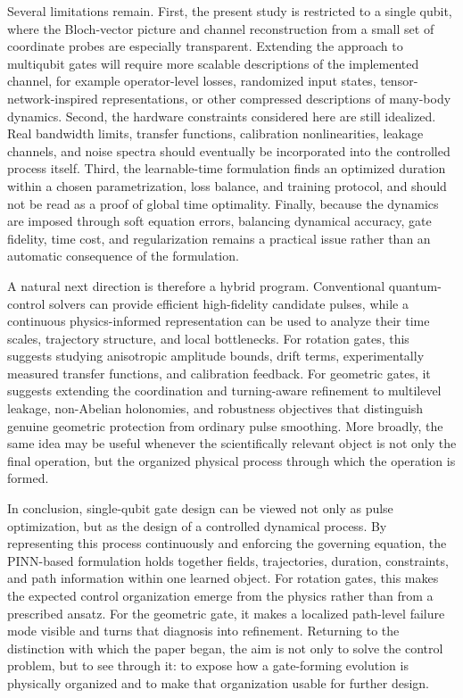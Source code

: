 \documentclass[aps,prx,reprint,superscriptaddress,nofootinbib,longbibliography,floatfix,showkeys]{revtex4-2}
\begin{document}
Several limitations remain.  First, the present study is restricted to a
single qubit, where the Bloch-vector picture and channel reconstruction
from a small set of coordinate probes are especially transparent.  Extending
the approach to multiqubit gates will require more scalable descriptions of
the implemented channel, for example operator-level losses, randomized
input states, tensor-network-inspired representations, or other compressed
descriptions of many-body dynamics.  Second, the hardware constraints
considered here are still idealized.  Real bandwidth limits, transfer
functions, calibration nonlinearities, leakage channels, and noise spectra
should eventually be incorporated into the controlled process itself.
Third, the learnable-time formulation finds an optimized duration within a
chosen parametrization, loss balance, and training protocol, and should not
be read as a proof of global time optimality.  Finally, because the
dynamics are imposed through soft equation errors, balancing dynamical
accuracy, gate fidelity, time cost, and regularization remains a practical
issue rather than an automatic consequence of the formulation.

A natural next direction is therefore a hybrid program.  Conventional
quantum-control solvers can provide efficient high-fidelity candidate
pulses, while a continuous physics-informed representation can be used to
analyze their time scales, trajectory structure, and local bottlenecks.
For rotation gates, this suggests studying anisotropic amplitude bounds,
drift terms, experimentally measured transfer functions, and calibration
feedback.  For geometric gates, it suggests extending the coordination and
turning-aware refinement to multilevel leakage, non-Abelian holonomies, and
robustness objectives that distinguish genuine geometric protection from
ordinary pulse smoothing.  More broadly, the same idea may be useful
whenever the scientifically relevant object is not only the final operation,
but the organized physical process through which the operation is formed.

In conclusion, single-qubit gate design can be viewed not only as pulse
optimization, but as the design of a controlled dynamical process.  By
representing this process continuously and enforcing the governing
equation, the PINN-based formulation holds together fields, trajectories,
duration, constraints, and path information within one learned object.  For
rotation gates, this makes the expected control organization emerge from
the physics rather than from a prescribed ansatz.  For the geometric gate,
it makes a localized path-level failure mode visible and turns that
diagnosis into refinement.  Returning to the distinction with which the
paper began, the aim is not only to solve the control problem, but to see
through it: to expose how a gate-forming evolution is physically organized
and to make that organization usable for further design.
\end{document}
